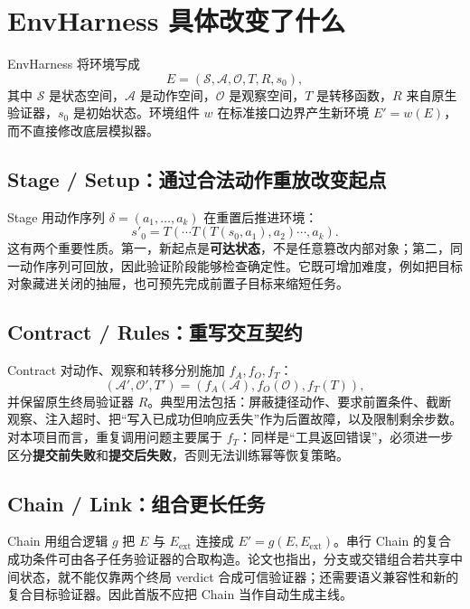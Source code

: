 \documentclass[11pt,a4paper,fontset=fandol]{ctexart}
\begin{document}
\section{EnvHarness 具体改变了什么}

EnvHarness 将环境写成
\begin{equation}
E=(\mathcal{S},\mathcal{A},\mathcal{O},T,R,s_0),
\end{equation}
其中 $\mathcal{S}$ 是状态空间，$\mathcal{A}$ 是动作空间，$\mathcal{O}$ 是观察空间，$T$ 是转移函数，$R$ 来自原生验证器，$s_0$ 是初始状态。环境组件 $w$ 在标准接口边界产生新环境 $E'=w(E)$，而不直接修改底层模拟器\cite{envharness}。

\subsection{Stage / Setup：通过合法动作重放改变起点}

Stage 用动作序列 $\delta=(a_1,\ldots,a_k)$ 在重置后推进环境：
\begin{equation}
s'_0=T(\cdots T(T(s_0,a_1),a_2)\cdots,a_k).
\end{equation}
这有两个重要性质。第一，新起点是\textbf{可达状态}，不是任意篡改内部对象；第二，同一动作序列可回放，因此验证阶段能够检查确定性。它既可增加难度，例如把目标对象藏进关闭的抽屉，也可预先完成前置子目标来缩短任务。

\subsection{Contract / Rules：重写交互契约}

Contract 对动作、观察和转移分别施加 $f_A,f_O,f_T$：
\begin{equation}
(\mathcal{A}',\mathcal{O}',T')=(f_A(\mathcal{A}),f_O(\mathcal{O}),f_T(T)),
\end{equation}
并保留原生终局验证器 $R$。典型用法包括：屏蔽捷径动作、要求前置条件、截断观察、注入超时、把“写入已成功但响应丢失”作为后置故障，以及限制剩余步数。对本项目而言，重复调用问题主要属于 $f_T$：同样是“工具返回错误”，必须进一步区分\textbf{提交前失败}和\textbf{提交后失败}，否则无法训练幂等恢复策略。

\subsection{Chain / Link：组合更长任务}

Chain 用组合逻辑 $g$ 把 $E$ 与 $E_{\mathrm{ext}}$ 连接成 $E'=g(E,E_{\mathrm{ext}})$。串行 Chain 的复合成功条件可由各子任务验证器的合取构造。论文也指出，分支或交错组合若共享中间状态，就不能仅靠两个终局 verdict 合成可信验证器；还需要语义兼容性和新的复合目标验证器\cite{envharness}。因此首版不应把 Chain 当作自动生成主线。
\end{document}
